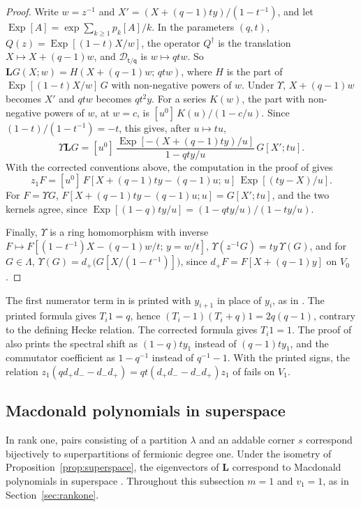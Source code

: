 \documentclass[11pt]{amsart}
\theoremstyle{definition}
\theoremstyle{remark}
\newcommand{\Mq}{\mathsf q}                      %
\newcommand{\Mt}{\mathsf t}                      %
\newcommand{\La}{\Lambda}                        %
\newcommand{\zz}[1]{z_{#1}}
\newcommand{\zone}{\zz{1}}
\newcommand{\dplus}{d_+}
\newcommand{\dminus}{d_-}
\newcommand{\LL}{\mathbf L}
\newcommand{\DD}{\mathcal D}
\newcommand{\Twist}[1]{\DD_{#1}}                 %
\newcommand{\Qcr}{Q}                             %
\newcommand{\Qan}{Q^\dagger}                     %
\newcommand{\Plethmap}{\Upsilon}                 %
\newcommand{\Exp}{\operatorname{Exp}}            %
\begin{document}
\begin{proof}
Write \(w=z^{-1}\) and \(X'=(X+(q-1)ty)/(1-t^{-1})\), and let \(\Exp[A]=\exp\sum_{k\geq1}p_k[A]/k\). In the
parameters \((q,t)\), \(\Qcr(z)=\Exp[(1-t)X/w]\), the operator \(\Qan\) is the translation \(X\mapsto X+(q-1)w\), and
\(\Twist{\Mt/\Mq}\) is \(w\mapsto qtw\). So \(\LL G(X;w)=H(X+(q-1)w;\,qtw)\), where \(H\) is the part of
\(\Exp[(1-t)X/w]\,G\) with non-negative powers of \(w\). Under \(\Plethmap\), \(X+(q-1)w\) becomes \(X'\) and \(qtw\)
becomes \(qt^2y\). For a series \(K(w)\), the part with non-negative powers of \(w\), at \(w=c\), is
\([u^0]\,K(u)/(1-c/u)\). Since \((1-t)/(1-t^{-1})=-t\), this gives, after \(u\mapsto tu\),
\[
 \Plethmap\LL G=[u^0]\,\frac{\Exp[-(X+(q-1)ty)/u]}{1-qty/u}\,G[X';tu].
\]
With the corrected conventions above, the computation in the proof of
\cite[Theorem~3.4.2]{CGM} gives
\[
 \zone F=[u^0]\,F[X+(q-1)ty-(q-1)u;\,u]\,\Exp[(ty-X)/u].
\]
For \(F=\Plethmap G\), \(F[X+(q-1)ty-(q-1)u;u]=G[X';tu]\), and the
two kernels agree, since \(\Exp[(1-q)ty/u]=(1-qty/u)/(1-ty/u)\).

Finally, \(\Plethmap\) is a ring homomorphism with
inverse \(F\mapsto F[(1-t^{-1})X-(q-1)w/t;\,y=w/t]\), \(\Plethmap(z^{-1}G)=ty\,\Plethmap(G)\), and for \(G\in\La\),
\(\Plethmap(G)=\dplus\bigl(G[X/(1-t^{-1})]\bigr)\), since \(\dplus F=F[X+(q-1)y]\) on \(V_0\) \cite[Proposition~3.4.1]{CGM}.
\end{proof}

The first numerator term in \cite[Proposition~3.4.1]{CGM} is printed with
\(y_{i+1}\) in place of \(y_i\), as in \cite[(2.10)]{GGS}.
The printed formula gives \(T_i1=q\), hence
\((T_i-1)(T_i+q)1=2q(q-1)\), contrary to the defining Hecke relation.
The corrected formula gives \(T_i1=1\).
The proof of \cite[Theorem~3.4.2]{CGM} also prints the spectral shift as
\((1-q)ty_1\) instead of \((q-1)ty_1\), and the commutator coefficient as
\(1-q^{-1}\) instead of \(q^{-1}-1\). With the printed signs, the relation
\(\zone(q\dplus\dminus-\dminus\dplus)=qt(\dplus\dminus-\dminus\dplus)\zone\)
of \cite[Definition~3.2.4]{CGM} fails on \(V_1\).

\subsection{Macdonald polynomials in superspace}\label{sec:superspace}

In rank one, pairs consisting of a partition \(\lambda\) and an addable corner \(s\)
correspond bijectively to superpartitions of fermionic degree one.
Under the isometry of Proposition~\ref{prop:superspace}, the eigenvectors of \(\LL\)
correspond to Macdonald polynomials in superspace \cite{BDLM1,BDLM2,Comp}. Throughout
this subsection \(m=1\) and \(v_1=1\), as in Section~\ref{sec:rankone}.
\end{document}
